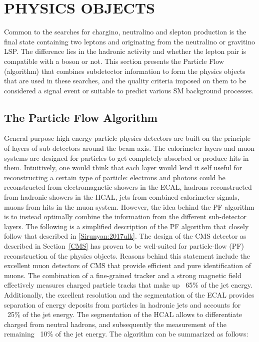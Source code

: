 \chapter{PHYSICS OBJECTS}
Common to the searches for chargino, neutralino and slepton production is the final state containing two leptons and \ptmiss originating from the neutralino or gravitino LSP.
The difference lies in the hadronic activity and whether the lepton pair is compatible with a \PZ boson or not. 
This section presents the Particle Flow (algorithm) that combines subdetector information to form the physics objects that are used in these searches, and the quality criteria imposed on them to be considered a signal event or suitable to predict various SM background processes.  
\section{The Particle Flow Algorithm}
General purpose high energy particle physics detectors are built on the principle of layers of sub-detectors around the beam axis. 
The calorimeter layers and muon systems are designed for particles to get completely absorbed or produce hits in them. 
Intuitively, one would think that each layer would lend it self useful for reconstructing a certain type of particle: electrons and photons could be reconstructed from electromagnetic showers in the ECAL, hadrons reconstructed from hadronic showers in the HCAL, jets from combined calorimeter signals, muons from hits in the muon system. 
However, the idea behind the PF algorithm is to instead optimally combine the information from the different sub-detector layers.   
The following is a simplified description of the PF algorithm that closely follow that described in \ref{Sirunyan:2017ulk}.
The design of the CMS detector as described in Section~\ref{CMS} has proven to be well-suited for particle-flow (PF) reconstruction of the physics objects. 
Reasons behind this statement include the excellent muon detectors of CMS that provide efficient and pure identification of muons. 
The combination of a fine-grained tracker and a strong magnetic field effectively measures charged particle tracks that make up ~65\% of the jet energy. 
Additionally, the excellent resolution and the segmentation of the ECAL provides separation of energy deposits from particles in hadronic jets and accounts for ~25\% of the jet energy. 
The segmentation of the HCAL allows to differentiate charged from neutral hadrons, and subsequently the measurement of the remaining ~10\% of the jet energy. 
The algorithm can be summarized as follows:
